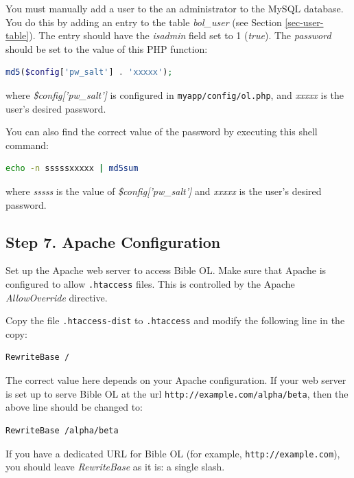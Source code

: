 \documentclass[11pt,oneside,a4paper]{memoir}
\newcommand{\q}{{\mainnolig '}}
\begin{document}
You must manually add a user to the an administrator to the MySQL database. You do this by adding an
entry to the table \emph{bol\_user} (see Section \ref{sec-user-table}). The entry should have the
\emph{isadmin} field set to 1 (\emph{true}). The \emph{password} should be set to the value of this
PHP function:

\begin{lstlisting}[language=PHP]
  md5($config['pw_salt'] . 'xxxxx');
\end{lstlisting}

where \emph{\$config[\q pw\_salt\q]} is configured in \texttt{myapp/config/ol.php}, and
\emph{xxxxx} is the user's desired password.

You can also find the correct value of the password by executing this shell command:

\begin{lstlisting}[language=bash]
  echo -n sssssxxxxx | md5sum
\end{lstlisting}

\noindent
where \emph{sssss} is the value of \emph{\$config[\q pw\_salt\q]} and \emph{xxxxx} is the user's
desired password.


\subsection{Step 7. Apache Configuration}

Set up the Apache web server to access Bible OL. Make sure that Apache is configured to allow
\texttt{.htaccess} files. This is controlled by the Apache \emph{AllowOverride} directive.


Copy the file \texttt{.htaccess-dist} to \texttt{.htaccess} and modify the following line in the
copy:

\begin{lstlisting}
RewriteBase /
\end{lstlisting}

The correct value here depends on your Apache configuration. If your web server is set up to serve
Bible OL at the url \texttt{http://example.com/alpha/beta}, then the above line should be changed to:

\begin{lstlisting}
RewriteBase /alpha/beta
\end{lstlisting}

If you have a dedicated URL for Bible OL (for example, \texttt{http://example.com}), you should
leave \emph{RewriteBase} as it is: a single slash.
\end{document}
